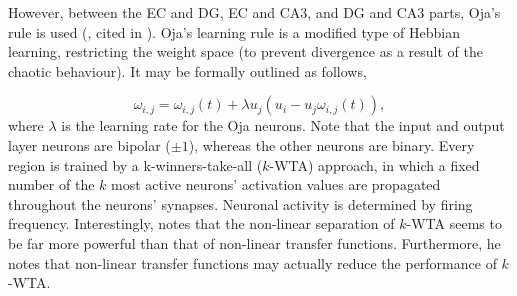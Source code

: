 However, between the EC and DG, EC and CA3, and DG and CA3 parts, Oja's rule is used (\cite{Hertz1991}, cited in \cite{Hattori2014}). Oja's learning rule is a modified type of Hebbian learning, restricting the weight space (to prevent divergence as a result of the chaotic behaviour). It may be formally outlined as follows,

\begin{equation}\label{ojas_rule}
    \omega_{i,j} = \omega_{i,j}(t) + \lambda u_j (u_i - u_j \omega_{i,j}(t)),
\end{equation}
where $\lambda$ is the learning rate for the Oja neurons. Note that the input and output layer neurons are bipolar ($\pm 1$), whereas the other neurons are binary. Every region is trained by a k-winners-take-all ($k$-WTA) approach, in which a fixed number of the $k$ most active neurons' activation values are propagated throughout the neurons' synapses. Neuronal activity is determined by firing frequency. Interestingly, \citep{Hattori2014} notes that the non-linear separation of $k$-WTA seems to be far more powerful than that of non-linear transfer functions. Furthermore, he notes that non-linear transfer functions may actually reduce the performance of $k$-WTA.

